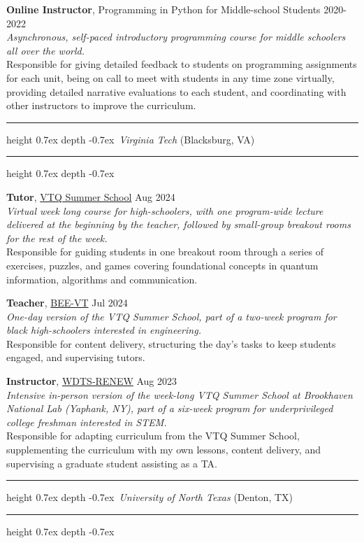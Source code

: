 \documentclass[marginmode, 10pt]{res} %
\def\Vhrulefill{\leavevmode\leaders\hrule height 0.7ex depth \dimexpr0.4pt-0.7ex\hfill\kern0pt}         %
\begin{document}
\begin{resume}
\textbf{Online Instructor}, Programming in Python for Middle-school Students \hfill 2020-2022 \\
\textit{Asynchronous, self-paced introductory programming course for middle schoolers all over the world.} \\
Responsible for giving detailed feedback to students on programming assignments for each unit, being on call to meet with students in any time zone virtually, providing detailed narrative evaluations to each student, and coordinating with other instructors to improve the curriculum.


\Vhrulefill ~\textit{Virginia Tech} (Blacksburg, VA)~ \Vhrulefill

\textbf{Tutor}, \href{https://vtq.vt.edu/outreach/Quantum-Information-Science-and-Engineering-High-School-level-Summer-School.html}{VTQ Summer School} \hfill Aug 2024 \\
\textit{Virtual week long course for high-schoolers, with one program-wide lecture delivered at the beginning by the teacher, followed by small-group breakout rooms for the rest of the week.} \\
Responsible for guiding students in one breakout room through a series of exercises, puzzles, and games covering foundational concepts in quantum information, algorithms and communication.

\textbf{Teacher}, \href{https://eng.vt.edu/ceed/ceed-pre-college-programs/BEEVT.html}{BEE-VT} \hfill Jul 2024 \\
\textit{One-day version of the VTQ Summer School, part of a two-week program for black high-schoolers interested in engineering.} \\
Responsible for content delivery, structuring the day's tasks to keep students engaged, and supervising tutors.

\textbf{Instructor}, \href{https://www.bnl.gov/education/programs/program.php?q=252}{WDTS-RENEW} \hfill Aug 2023 \\
\textit{Intensive in-person version of the week-long VTQ Summer School at Brookhaven National Lab (Yaphank, NY), part of a six-week program for underprivileged college freshman interested in STEM.} \\
Responsible for adapting curriculum from the VTQ Summer School, supplementing the curriculum with my own lessons, content delivery, and supervising a graduate student assisting as a TA.


\Vhrulefill ~\textit{University of North Texas} (Denton, TX)~ \Vhrulefill


\end{resume}
\end{document}

